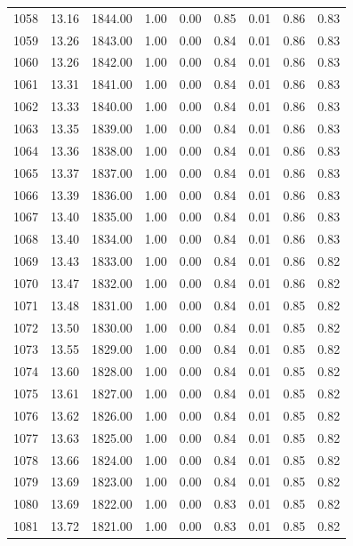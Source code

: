 \documentclass{article}\usepackage[]{graphicx}\usepackage[]{color}
\begin{document}
\begin{longtable}{rrrrrrrrr}
  1058 & 13.16 & 1844.00 & 1.00 & 0.00 & 0.85 & 0.01 & 0.86 & 0.83 \\ 
  1059 & 13.26 & 1843.00 & 1.00 & 0.00 & 0.84 & 0.01 & 0.86 & 0.83 \\ 
  1060 & 13.26 & 1842.00 & 1.00 & 0.00 & 0.84 & 0.01 & 0.86 & 0.83 \\ 
  1061 & 13.31 & 1841.00 & 1.00 & 0.00 & 0.84 & 0.01 & 0.86 & 0.83 \\ 
  1062 & 13.33 & 1840.00 & 1.00 & 0.00 & 0.84 & 0.01 & 0.86 & 0.83 \\ 
  1063 & 13.35 & 1839.00 & 1.00 & 0.00 & 0.84 & 0.01 & 0.86 & 0.83 \\ 
  1064 & 13.36 & 1838.00 & 1.00 & 0.00 & 0.84 & 0.01 & 0.86 & 0.83 \\ 
  1065 & 13.37 & 1837.00 & 1.00 & 0.00 & 0.84 & 0.01 & 0.86 & 0.83 \\ 
  1066 & 13.39 & 1836.00 & 1.00 & 0.00 & 0.84 & 0.01 & 0.86 & 0.83 \\ 
  1067 & 13.40 & 1835.00 & 1.00 & 0.00 & 0.84 & 0.01 & 0.86 & 0.83 \\ 
  1068 & 13.40 & 1834.00 & 1.00 & 0.00 & 0.84 & 0.01 & 0.86 & 0.83 \\ 
  1069 & 13.43 & 1833.00 & 1.00 & 0.00 & 0.84 & 0.01 & 0.86 & 0.82 \\ 
  1070 & 13.47 & 1832.00 & 1.00 & 0.00 & 0.84 & 0.01 & 0.86 & 0.82 \\ 
  1071 & 13.48 & 1831.00 & 1.00 & 0.00 & 0.84 & 0.01 & 0.85 & 0.82 \\ 
  1072 & 13.50 & 1830.00 & 1.00 & 0.00 & 0.84 & 0.01 & 0.85 & 0.82 \\ 
  1073 & 13.55 & 1829.00 & 1.00 & 0.00 & 0.84 & 0.01 & 0.85 & 0.82 \\ 
  1074 & 13.60 & 1828.00 & 1.00 & 0.00 & 0.84 & 0.01 & 0.85 & 0.82 \\ 
  1075 & 13.61 & 1827.00 & 1.00 & 0.00 & 0.84 & 0.01 & 0.85 & 0.82 \\ 
  1076 & 13.62 & 1826.00 & 1.00 & 0.00 & 0.84 & 0.01 & 0.85 & 0.82 \\ 
  1077 & 13.63 & 1825.00 & 1.00 & 0.00 & 0.84 & 0.01 & 0.85 & 0.82 \\ 
  1078 & 13.66 & 1824.00 & 1.00 & 0.00 & 0.84 & 0.01 & 0.85 & 0.82 \\ 
  1079 & 13.69 & 1823.00 & 1.00 & 0.00 & 0.84 & 0.01 & 0.85 & 0.82 \\ 
  1080 & 13.69 & 1822.00 & 1.00 & 0.00 & 0.83 & 0.01 & 0.85 & 0.82 \\ 
  1081 & 13.72 & 1821.00 & 1.00 & 0.00 & 0.83 & 0.01 & 0.85 & 0.82 \\ 

\end{longtable}
\end{document}
